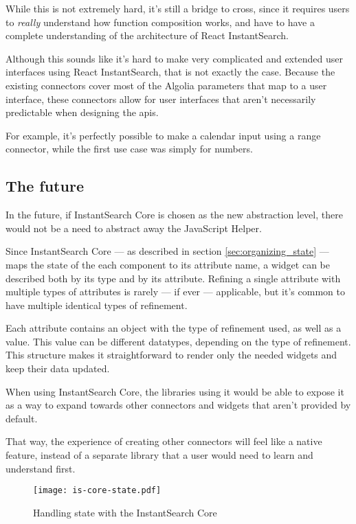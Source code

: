 While this is not extremely hard, it's still a bridge to cross, since it requires users to \emph{really} understand how function composition works, and have to have a complete understanding of the architecture of React InstantSearch.

Although this sounds like it's hard to make very complicated and extended user interfaces using React InstantSearch, that is not exactly the case. Because the existing connectors cover most of the Algolia parameters that map to a user interface, these connectors allow for user interfaces that aren't necessarily predictable when designing the \acrshort{api}s. 

For example, it's perfectly possible to make a calendar input using a range connector, while the first use case was simply for numbers.


\subsection{The future} %
\label{sub:the_future}

In the future, if InstantSearch Core is chosen as the new abstraction level, there would not be a need to abstract away the JavaScript Helper. 

Since InstantSearch Core --- as described in section \ref{sec:organizing_state} --- maps the state of the each component to its \gls{attribute} name, a widget can be described both by its type and by its attribute. Refining a single attribute with multiple types of attributes is rarely --- if ever --- applicable, but it's common to have multiple identical types of refinement.

Each attribute contains an object with the type of refinement used, as well as a value. This value can be different datatypes, depending on the type of refinement. This structure makes it straightforward to render only the needed widgets and keep their data updated.

When using InstantSearch Core, the libraries using it would be able to expose it as a way to expand towards other connectors and widgets that aren't provided by default.

That way, the experience of creating other connectors will feel like a native feature, instead of a separate \gls{library} that a user would need to learn and understand first.

\begin{figure}[H]
  \centering
  \texttt{[image: is-core-state.pdf]}
  \caption{Handling state with the InstantSearch Core}
  \label{figure:is-core-state}
\end{figure}

